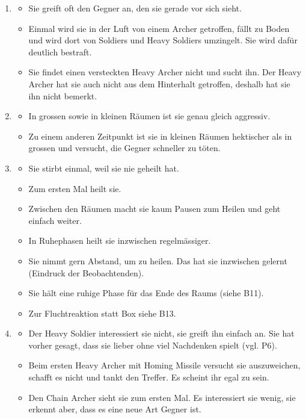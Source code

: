 \documentclass[../Main.tex]{subfiles}
\begin{document}
\begin{enumerate}[label=\textbf{B\arabic*}, leftmargin=1.5cm, itemsep=0.8em, resume]
\item
    \begin{itemize}[nosep]
        \item Sie greift oft den Gegner an, den sie gerade vor sich sieht.
        \item Einmal wird sie in der Luft von einem Archer getroffen, fällt zu Boden und wird dort von Soldiers und Heavy Soldiers umzingelt. Sie wird dafür deutlich bestraft.
        \item Sie findet einen versteckten Heavy Archer nicht und sucht ihn. Der Heavy Archer hat sie auch nicht aus dem Hinterhalt getroffen, deshalb hat sie ihn nicht bemerkt.
    \end{itemize}

\item
    \begin{itemize}[nosep]
        \item In grossen sowie in kleinen Räumen ist sie genau gleich aggressiv.
        \item Zu einem anderen Zeitpunkt ist sie in kleinen Räumen hektischer als in grossen und versucht, die Gegner schneller zu töten.
    \end{itemize}

\item
    \begin{itemize}[nosep]
        \item Sie stirbt einmal, weil sie nie geheilt hat.
        \item Zum ersten Mal heilt sie.
        \item Zwischen den Räumen macht sie kaum Pausen zum Heilen und geht einfach weiter.
        \item In Ruhephasen heilt sie inzwischen regelmässiger.
        \item Sie nimmt gern Abstand, um zu heilen. Das hat sie inzwischen gelernt (Eindruck der Beobachtenden).
        \item Sie hält eine ruhige Phase für das Ende des Raums (siehe B11).
        \item Zur Fluchtreaktion statt Box siehe B13.
    \end{itemize}

\item
    \begin{itemize}[nosep]
        \item Der Heavy Soldier interessiert sie nicht, sie greift ihn einfach an. Sie hat vorher gesagt, dass sie lieber ohne viel Nachdenken spielt (vgl. P6).
        \item Beim ersten Heavy Archer mit Homing Missile versucht sie auszuweichen, schafft es nicht und tankt den Treffer. Es scheint ihr egal zu sein.
        \item Den Chain Archer sieht sie zum ersten Mal. Es interessiert sie wenig, sie erkennt aber, dass es eine neue Art Gegner ist.
    \end{itemize}
\end{enumerate}
\end{document}
